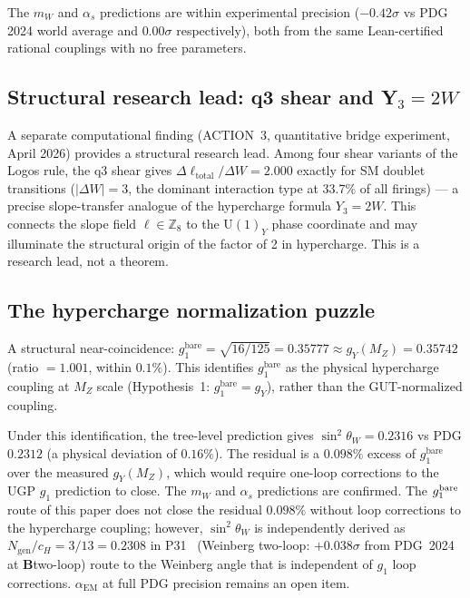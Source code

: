 \documentclass[12pt]{article}
\theoremstyle{remark}
\newcommand{\sinW}{\sin^2\!\theta_W}
\newcommand{\CatB}{\textbf{B}}
\begin{document}
The $m_W$ and $\alpha_s$ predictions are within experimental precision
($-0.42\sigma$ vs PDG 2024 world average and $0.00\sigma$ respectively), both from the same
Lean-certified rational couplings with no free parameters.

\subsection{Structural research lead: q3 shear and Y$_3 = 2W$}

A separate computational finding (ACTION~3, quantitative bridge experiment,
April 2026) provides a structural research lead.  Among four shear variants of
the Logos rule, the q3 shear gives $\Delta\ell_\text{total}/\Delta W = 2.000$
exactly for SM doublet transitions ($|\Delta W| = 3$, the dominant interaction
type at 33.7\% of all firings) --- a precise slope-transfer analogue of the
hypercharge formula $Y_3 = 2W$.  This connects the slope field $\ell \in
\mathbb{Z}_8$ to the $\mathrm{U}(1)_Y$ phase coordinate and may illuminate the
structural origin of the factor of 2 in hypercharge.  This is a research lead,
not a theorem.

\subsection{The hypercharge normalization puzzle}

A structural near-coincidence:
$g_1^\text{bare} = \sqrt{16/125} = 0.35777 \approx g_Y(M_Z) = 0.35742$
(ratio $= 1.001$, within $0.1\%$).
This identifies $g_1^\text{bare}$ as the physical hypercharge coupling at $M_Z$
scale (Hypothesis~1: $g_1^\text{bare} = g_Y$), rather than the
GUT-normalized coupling.

Under this identification, the tree-level prediction gives
$\sinW = 0.2316$ vs PDG $0.2312$ (a physical deviation of $0.16\%$).
The residual is a $0.098\%$ excess of $g_1^\text{bare}$ over the measured
$g_Y(M_Z)$, which would require one-loop corrections to the UGP $g_1$
prediction to close.  The $m_W$ and $\alpha_s$ predictions are confirmed.  The $g_1^{\rm bare}$
route of this paper does not close the residual $0.098\%$ without loop
corrections to the hypercharge coupling; however, $\sinW$ is independently
derived as $N_{\mathrm{gen}}/c_H = 3/13 = 0.2308$ in P31~\cite{SpivackWeinbergAngle}
(Weinberg two-loop: $+0.038\sigma$ from PDG~2024 at \CatB two-loop)
route to the Weinberg angle that is independent of $g_1$ loop corrections.
$\alpha_\mathrm{EM}$ at full PDG precision remains an open item.
\end{document}
